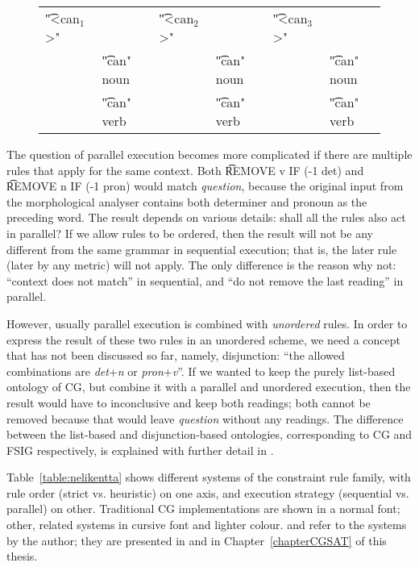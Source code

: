 \begin{figure}[h]
\begin{tabular}{p{0.5cm} l   p{0.5cm} l    p{0.5cm} l}
\t{"<can$_1$>"}      &  & \t{"<can$_2$>"}  & & \t{"<can$_3$>"} & \\
   & \t{"can" noun}  &  & \t{"can" noun} & & \t{"can" noun}   \\
   & \t{"can" verb}  &  & \t{"can" verb} & & \t{"can" verb} 

\end{tabular}
\end{figure}

The question of parallel execution becomes more complicated if there
are multiple rules that apply for the same context.  Both \t{REMOVE v
  IF (-1 det)} and \t{REMOVE n IF (-1 pron)} would match
\emph{question}, because the original input from the morphological
analyser contains both determiner and pronoun as the preceding word.
The result depends on various details: shall all the rules also act in
parallel?  If we allow rules to be ordered, then the result will not
be any different from the same grammar in sequential execution; that
is, the later rule (later by any metric) will not apply.  The only
difference is the reason why not: ``context does not match'' in
sequential, and ``do not remove the last reading'' in parallel.

However, usually parallel execution is combined with \emph{unordered}
rules.  In order to express the result of these two rules in an
unordered scheme, we need a concept that has not been discussed so
far, namely, disjunction: ``the allowed combinations are {\em
  det}+{\em n} or {\em pron}+{\em v}''.  If we wanted to keep the
purely list-based ontology of CG, but combine it with a parallel and
unordered execution, then the result would have to inconclusive and
keep both readings; both cannot be removed because that would leave
{\em question} without any readings.  The difference between the
list-based and disjunction-based ontologies, corresponding to CG and
FSIG respectively, is explained with further detail in
\citet{lager_nivre01}.

Table~\ref{table:nelikentta} shows different systems of the constraint
rule family, with rule order (strict vs. heuristic) on one axis, and
execution strategy (sequential vs. parallel) on other.  Traditional CG
implementations are shown in a normal font; other, related systems in
cursive font and lighter colour.  \satcgMax and \satcgOrd refer to the
systems by the author; they are presented in
\citet{listenmaa_claessen2015} and in Chapter~\ref{chapterCGSAT} of
this thesis.


